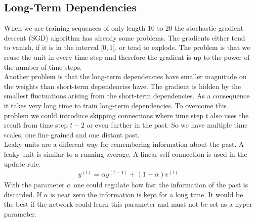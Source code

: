 \subsection{Long-Term Dependencies}
\label{sec:ltd}
When we are training sequences of only length 10 to 20 the stochastic gradient descent (SGD) algorithm has already some problems. The gradients either tend to vanish, if it is in the interval $[0, 1[$, or tend to explode. The problem is that we reuse the unit in every time step and therefore the gradient is up to the power of the number of time steps.\\
Another problem is that the long-term dependencies have smaller magnitude on the weights than short-term dependencies have. The gradient is hidden by the smallest fluctuations arising from the short-term dependencies. As a consequence it takes very long time to train long-term dependencies. To overcome this problem we could introduce skipping connections where time step $t$ also uses the result from time step $t-2$ or even further in the past. So we have multiple time scales, one fine grained and one distant past.\\
Leaky units are a different way for remembering information about the past. A leaky unit is similar to a running average. A linear self-connection is used in the update rule.
\begin{align}
y^{(t)} = \alpha y^{(t-1)} + (1-\alpha)v^{(t)}
\end{align}
With the parameter $\alpha$ one could regulate how fast the information of the past is discarded. If $\alpha$ is near zero the information is kept for a long time. It would be the best if the network could learn this parameter and must not be set as a hyper parameter.

